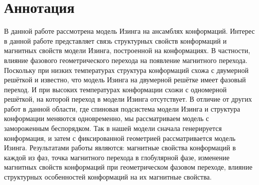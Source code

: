 \section*{Аннотация}
В данной работе рассмотрена модель Изинга на ансамблях конформаций. 
Интерес в данной работе представляет связь структурных свойств конформаций и магнитных свойств модели Изинга, построенной на конформациях. В частности, влияние фазового геометрического перехода на появление магнитного перехода. Поскольку при низких температурах структура конформаций схожа с двумерной решёткой и известно, что модель Изинга на двумерной решётке имеет фазовый переход. И при высоких температурах конформации схожи с одномерной решёткой, на которой переход в модели Изинга отсутствует.
В отличие от других работ в данной области, где спиновая подсистема модели Изинга и структура конформации меняются одновременно, мы рассматриваем модель с замороженным беспорядком. Так в нашей модели сначала генерируется конформация, и затем с фиксированной геометрией рассматривается модель Изинга.
Результатами работы являются: магнитные свойства конформаций в каждой из фаз, точка магнитного перехода в глобулярной фазе, изменение магнитных свойств конформаций при геометрическом фазовом переходе, влияние структурных особенностей конформаций на их магнитные свойства.